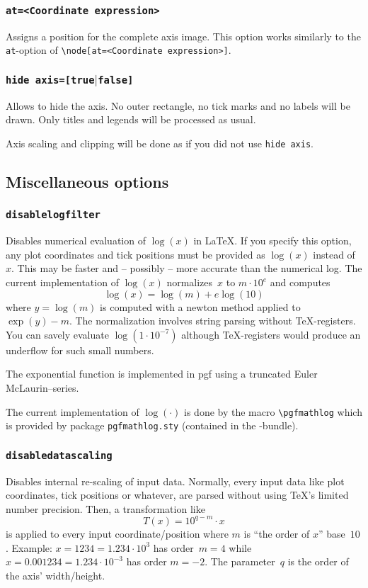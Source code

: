 \subsubsection{\texttt{at=<Coordinate expression>}}
Assigns a position for the complete axis image. This option works similarly to the \texttt{at}-option of \lstinline!\node[at=<Coordinate expression>]!.

\subsubsection{\texttt{hide axis=[true$|$false]}}
Allows to hide the axis. No outer rectangle, no tick marks and no labels will be drawn. Only titles and legends will be processed as usual.

Axis scaling and clipping will be done as if you did not use \texttt{hide axis}.




\subsection{Miscellaneous options}

\subsubsection{\texttt{disablelogfilter}}
Disables numerical evaluation of $\log(x)$ in \LaTeX. If you specify this option, any plot coordinates and tick positions must be provided as $\log(x)$ instead of $x$. This may be faster and -- possibly -- more accurate than the numerical log. The current implementation of $\log(x)$ normalizes~$x$ to $m\cdot 10^e$ and computes
\[ \log(x) = \log(m) + e \log(10) \]
where $y = \log(m)$ is computed with a newton method applied to $\exp(y) - m$. The normalization involves string parsing without \TeX-registers. You can savely evaluate $\log(1\cdot 10^{-7})$ although \TeX-registers would produce an underflow for such small numbers. 

The exponential function is implemented in pgf using a truncated Euler McLaurin--series.

The current implementation of $\log(\cdot)$ is done by the macro \lstinline!\pgfmathlog! which is provided by package \lstinline!pgfmathlog.sty! (contained in the \PGFPlots-bundle).

\subsubsection{\texttt{disabledatascaling}}
\label{sec:disabledatascaling}%
Disables internal re-scaling of input data. Normally, every input data like plot coordinates, tick positions or whatever, are parsed without using \TeX's limited number precision. Then, a transformation like 
	\[ T(x) = 10^{q-m} \cdot x \]
is applied to every input coordinate/position where $m$ is ``the order of $x$'' base~$10$. Example: $x=1234 = 1.234\cdot 10^3$ has order~$m=4$ while $x=0.001234 = 1.234\cdot 10^{-3}$ has order $m=-2$. The parameter~$q$ is the order of the axis' width/height.

